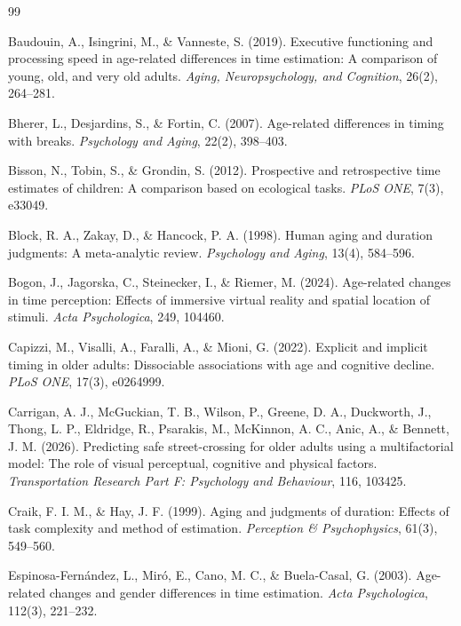 \documentclass{custom_report}
\begin{document}
\begin{thebibliography}{99}

Baudouin, A., Isingrini, M., \& Vanneste, S. (2019). Executive functioning and processing speed in age-related differences in time estimation: A comparison of young, old, and very old adults. \textit{Aging, Neuropsychology, and Cognition}, 26(2), 264–281.

Bherer, L., Desjardins, S., \& Fortin, C. (2007). Age-related differences in timing with breaks. \textit{Psychology and Aging}, 22(2), 398–403.

Bisson, N., Tobin, S., \& Grondin, S. (2012). Prospective and retrospective time estimates of children: A comparison based on ecological tasks. \textit{PLoS ONE}, 7(3), e33049.

Block, R. A., Zakay, D., \& Hancock, P. A. (1998). Human aging and duration judgments: A meta-analytic review. \textit{Psychology and Aging}, 13(4), 584–596.

Bogon, J., Jagorska, C., Steinecker, I., \& Riemer, M. (2024). Age-related changes in time perception: Effects of immersive virtual reality and spatial location of stimuli. \textit{Acta Psychologica}, 249, 104460.

Capizzi, M., Visalli, A., Faralli, A., \& Mioni, G. (2022). Explicit and implicit timing in older adults: Dissociable associations with age and cognitive decline. \textit{PLoS ONE}, 17(3), e0264999.

Carrigan, A. J., McGuckian, T. B., Wilson, P., Greene, D. A., Duckworth, J., Thong, L. P., Eldridge, R., Psarakis, M., McKinnon, A. C., Anic, A., \& Bennett, J. M. (2026). Predicting safe street-crossing for older adults using a multifactorial model: The role of visual perceptual, cognitive and physical factors. \textit{Transportation Research Part F: Psychology and Behaviour}, 116, 103425.

Craik, F. I. M., \& Hay, J. F. (1999). Aging and judgments of duration: Effects of task complexity and method of estimation. \textit{Perception \& Psychophysics}, 61(3), 549–560.

Espinosa-Fernández, L., Miró, E., Cano, M. C., \& Buela-Casal, G. (2003). Age-related changes and gender differences in time estimation. \textit{Acta Psychologica}, 112(3), 221–232.


\end{thebibliography}
\end{document}
